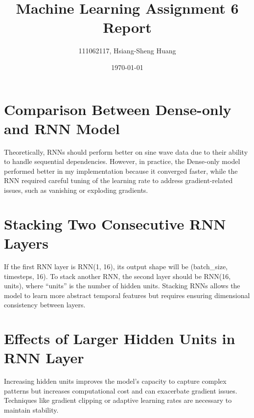 \documentclass[12pt]{article}
\title{Machine Learning Assignment 6 Report}
\author{111062117, Hsiang-Sheng Huang}
\date{\today}
\begin{document}
\maketitle

\section*{Comparison Between Dense-only and RNN Model}
Theoretically, RNNs should perform better on sine wave data due to their ability to handle sequential dependencies. However, in practice, the Dense-only model performed better in my implementation because it converged faster, while the RNN required careful tuning of the learning rate to address gradient-related issues, such as vanishing or exploding gradients.

\section*{Stacking Two Consecutive RNN Layers}
If the first RNN layer is RNN(1, 16), its output shape will be (batch\_size, timesteps, 16). To stack another RNN, the second layer should be RNN(16, units), where “units” is the number of hidden units. Stacking RNNs allows the model to learn more abstract temporal features but requires ensuring dimensional consistency between layers.

\section*{Effects of Larger Hidden Units in RNN Layer}
Increasing hidden units improves the model’s capacity to capture complex patterns but increases computational cost and can exacerbate gradient issues. Techniques like gradient clipping or adaptive learning rates are necessary to maintain stability.
\end{document}
